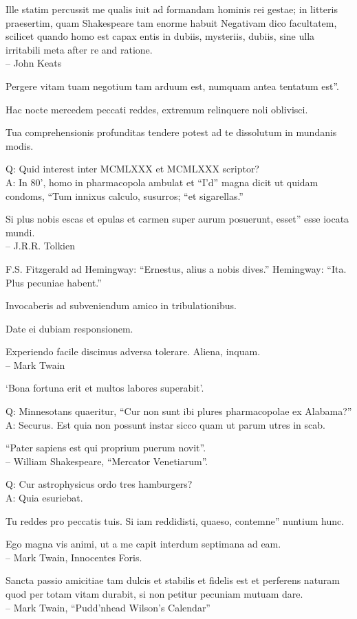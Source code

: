 \documentclass[titlepage,12pt]{memoir}
\begin{document}
Ille statim percussit me qualis iuit ad formandam hominis rei gestae;
in litteris praesertim, quam Shakespeare tam enorme habuit
Negativam dico facultatem, scilicet quando homo est capax entis
in dubiis, mysteriis, dubiis, sine ulla irritabili meta
after re and ratione.
\\-- John Keats

Pergere vitam tuam negotium tam arduum est, numquam antea tentatum est”.

Hac nocte mercedem peccati reddes, extremum relinquere noli oblivisci.

Tua comprehensionis profunditas tendere potest ad te dissolutum in mundanis modis.

Q: Quid interest inter MCMLXXX et MCMLXXX scriptor?\\
A: In 80’, homo in pharmacopola ambulat et “I’d” magna dicit
ut quidam condoms, “Tum innixus calculo, susurros;
“et sigarellas.”

Si plus nobis escas et epulas et carmen super aurum posuerunt, esset”
esse iocata mundi.
\\-- J.R.R. Tolkien

F.S. Fitzgerald ad Hemingway:
“Ernestus, alius a nobis dives.”
Hemingway:
“Ita. Plus pecuniae habent.”

Invocaberis ad subveniendum amico in tribulationibus.

Date ei dubiam responsionem.

Experiendo facile discimus adversa tolerare. Aliena, inquam.
\\-- Mark Twain

‘Bona fortuna erit et multos labores superabit’.

Q: Minnesotans quaeritur, “Cur non sunt ibi plures pharmacopolae ex Alabama?”\\
A: Securus. Est quia non possunt instar sicco quam ut parum
utres in scab.

“Pater sapiens est qui proprium puerum novit”.
\\-- William Shakespeare, “Mercator Venetiarum”.

Q: Cur astrophysicus ordo tres hamburgers?\\
A: Quia esuriebat.

Tu reddes pro peccatis tuis. Si iam reddidisti, quaeso, contemne”
nuntium hunc.

Ego magna vis animi, ut a me capit
interdum septimana ad eam.
\\-- Mark Twain, Innocentes Foris.

 Sancta passio amicitiae tam dulcis et stabilis et fidelis est et
perferens naturam quod per totam vitam durabit, si non petitur
pecuniam mutuam dare.
\\-- Mark Twain, “Pudd’nhead Wilson’s Calendar”
\end{document}
